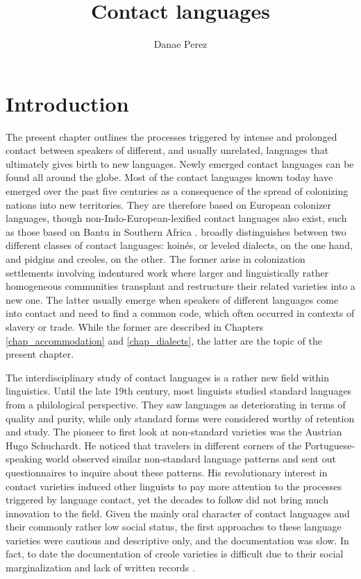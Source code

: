 \documentclass[output=paper]{langscibook}
\title{Contact languages}
\author{Danae Perez\affiliation{Zurich University of Applied Sciences}}
\begin{document}
\maketitle
\label{chap_contactlanguages}

\section{Introduction}

The present chapter outlines the processes triggered by intense and prolonged contact between speakers of different, and usually unrelated, languages that ultimately gives birth to new languages. Newly emerged contact languages can be found all around the globe. Most of the contact languages known today have emerged over the past five centuries as a consequence of the spread of colonizing nations into new territories. They are therefore based on European colonizer languages, though non-Indo-European-lexified contact languages also exist, such as those based on Bantu in Southern Africa \parencite{apics}. \textcite{meshtrie2017slavery} broadly distinguishes between two different classes of contact languages: koinés, or leveled dialects, on the one hand, and pidgins and creoles, on the other. The former arise in colonization settlements involving indentured work where larger and linguistically rather homogeneous communities transplant and restructure their related varieties into a new one. The latter usually emerge when speakers of different languages come into contact and need to find a common code, which often occurred in contexts of slavery or trade. While the former are described in Chapters \ref{chap_accommodation} and \ref{chap_dialects}, the latter are the topic of the present chapter.

\begin{sloppypar}
The interdisciplinary study of contact languages is a rather new field within linguistics. Until the late 19th century, most linguists studied standard languages from a philological perspective. They saw languages as deteriorating in terms of quality and purity, while only standard forms were considered worthy of retention and study. The pioneer to first look at non-standard varieties was the Austrian Hugo Schuchardt. He noticed that travelers in different corners of the Portuguese-speaking world observed similar non-standard language patterns and sent out questionnaires to inquire about these patterns. His revolutionary interest in contact varieties induced other linguists to pay more attention to the processes triggered by language contact, yet the decades to follow did not bring much innovation to the field. Given the mainly oral character of contact languages and their commonly rather low social status, the first approaches to these language varieties were cautious and descriptive only, and the documentation was slow. In fact, to date the documentation of creole varieties is difficult due to their social marginalization and lack of written records \citep[cf.][]{garrett2006contact}.
\end{sloppypar}
\end{document}
